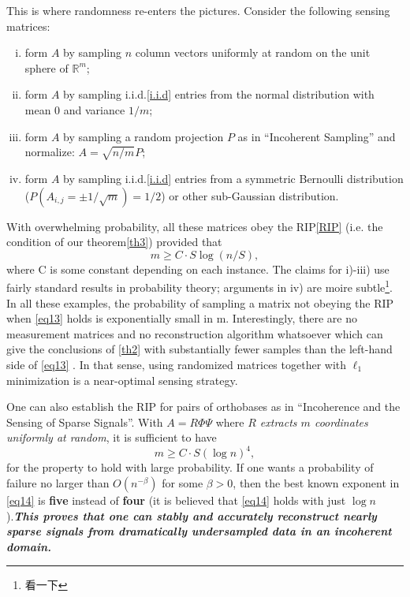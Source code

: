 This is where randomness re-enters the pictures. Consider the following sensing matrices:
\begin{enumerate}[i)]
	\item form $A$ by sampling $n$ column vectors uniformly at random on the unit sphere of $\mathbb{R}^m$;
	\item form $A$ by sampling i.i.d.\cref{i.i.d} entries from the normal distribution with mean 0 and variance $1/m$;
	\item form $A$ by sampling a random projection $P$ as in ``Incoherent Sampling'' and normalize: $A=\sqrt{n/m}P$;
	\item form $A$ by sampling i.i.d.\cref{i.i.d} entries from a symmetric Bernoulli distribution ($P(A_{i,j}=\pm 1/ \sqrt{m})=1/2$) or other sub-Gaussian distribution.
\end{enumerate}
With overwhelming probability, all these matrices obey the RIP\cref{RIP} (i.e. the condition of our theorem\cref{th3}) provided that
\begin{equation}
\label{eq13}
m \geq C \cdot S\log(n/S),
\end{equation}
where C is some constant depending on each instance. The claims for i)-iii) use fairly standard results in probability theory; arguments in iv) are moire subtle\footnote{\cite{23}看一下}\cite{23,24}. In all these examples, the probability of sampling a matrix not obeying the RIP when \cref{eq13} holds is exponentially small in m. Interestingly, there are no measurement matrices and no reconstruction algorithm whatsoever which can give the conclusions of \cref{th2} with substantially fewer samples than the left-hand side of \cref{eq13} \cite{Candes2006,3}. In that sense, using randomized matrices together with $\ell_1$ minimization is a near-optimal sensing strategy.

One can also establish the RIP for pairs of orthobases as in ``Incoherence and the Sensing of Sparse Signals''. With $A=R\Phi\Psi$ where\textcolor[rgb]{1,0,0}{\emph{ $R$ extracts $m$ coordinates uniformly at random}}, it is sufficient to have
\begin{equation}
\label{eq14}
m \geq C \cdot S(\log n)^4,
\end{equation}
for the property to hold with large probability\cite{Candes2006,25}. If one wants a probability of failure no larger than $O(n^{-\beta})$ for some $\beta>0$, then the best known exponent in \cref{eq14} is \textbf{five} instead of \textbf{four} (it is believed that \cref{eq14} holds with just $\log n$).\textcolor[rgb]{1,0,0}{\textbf{\emph{This proves that one can stably and accurately reconstruct nearly sparse signals from dramatically undersampled data in an incoherent domain.}}}

